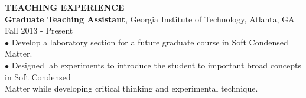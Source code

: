 \documentclass[10pt]{article}
\begin{document}








\textbf{\large TEACHING EXPERIENCE} \\
{\bf Graduate Teaching Assistant}, Georgia Institute of Technology, Atlanta, GA \hfill Fall 2013 - Present\\
\hspace*{10pt}$\bullet$ Develop a laboratory section for a future graduate course in Soft Condensed Matter.  \\
\hspace*{10pt}$\bullet$ Designed lab experiments to introduce the student to important broad concepts in Soft Condensed \\ \hspace*{15pt} Matter while developing critical thinking and experimental technique.  \\
\end{document}
